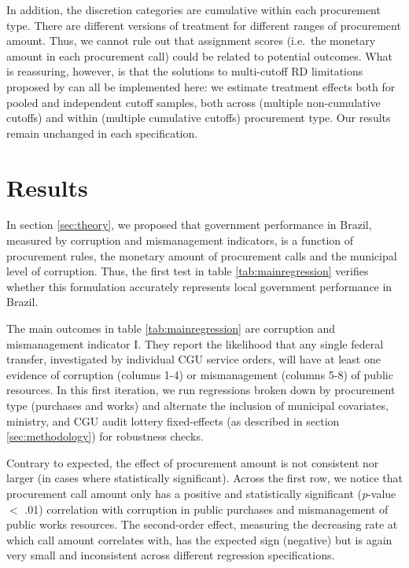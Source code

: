 \documentclass[11pt]{article}
\begin{document}
In addition, the discretion categories are cumulative within each procurement type. There are different versions of treatment for different ranges of procurement amount. Thus, we cannot rule out that assignment scores (i.e.~the monetary amount in each procurement call) could be related to potential outcomes. What is reassuring, however, is that the solutions to multi-cutoff RD limitations proposed by \citet{CattaneoInterpretingRegressionDiscontinuity2016} can all be implemented here: we estimate treatment effects both for pooled and independent cutoff samples, both across (multiple non-cumulative cutoffs) and within (multiple cumulative cutoffs) procurement type. Our results remain unchanged in each specification.

\section{Results} \label{sec:result}

In section \ref{sec:theory}, we proposed that government performance in Brazil, measured by corruption and mismanagement indicators, is a function of procurement rules, the monetary amount of procurement calls and the municipal level of corruption. Thus, the first test in table \ref{tab:mainregression} verifies whether this formulation accurately represents local government performance in Brazil.

The main outcomes in table \ref{tab:mainregression} are corruption and mismanagement indicator I. They report the likelihood that any single federal transfer, investigated by individual CGU service orders, will have at least one evidence of corruption (columns 1-4) or mismanagement (columns 5-8) of public resources. In this first iteration, we run regressions broken down by procurement type (purchases and works) and alternate the inclusion of municipal covariates, ministry, and CGU audit lottery fixed-effects (as described in section \ref{sec:methodology}) for robustness checks.

Contrary to expected, the effect of procurement amount is not consistent nor larger (in cases where statistically significant). Across the first row, we notice that procurement call amount only has a positive and statistically significant (\emph{p}-value $<$ .01) correlation with corruption in public purchases and mismanagement of public works resources. The second-order effect, measuring the decreasing rate at which call amount correlates with, has the expected sign (negative) but is again very small and inconsistent across different regression specifications.
\clearpage

\end{document}
